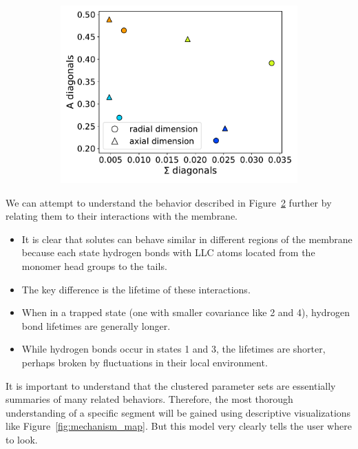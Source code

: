 \documentclass{article}
\begin{document}
\begin{figure}
\begin{subfigure}{0.35\textwidth}
  \includegraphics[width=\textwidth]{A_sigma_scatter_MET.pdf}
  \caption{}\label{fig:A_sigma_scatter_MET}
  \end{subfigure}
  \caption{}\label{fig:common_states_MET}
  \end{figure}
  
  We can attempt to understand the behavior described in Figure~\ref{fig:common_states_MET}
  further by relating them to their interactions with the membrane. 
  \begin{itemize}
    \item It is clear that solutes can behave similar in different regions of the 
    membrane because each state hydrogen bonds with LLC atoms located from the monomer head
    groups to the tails. 
    \item The key difference is the lifetime of these interactions. 
    \item When in a trapped state (one with smaller covariance like 2 and 4), hydrogen bond
    lifetimes are generally longer.
    \item While hydrogen bonds occur in states 1 and 3, the lifetimes are shorter, perhaps
    broken by fluctuations in their local environment.
  \end{itemize}
  
  It is important to understand that the clustered parameter sets are
  essentially summaries of many related behaviors. Therefore, the most thorough
  understanding of a specific segment will be gained using descriptive visualizations
  like Figure~\ref{fig:mechanism_map}. But this model very clearly tells the user where
  to look.
  
\end{document}
